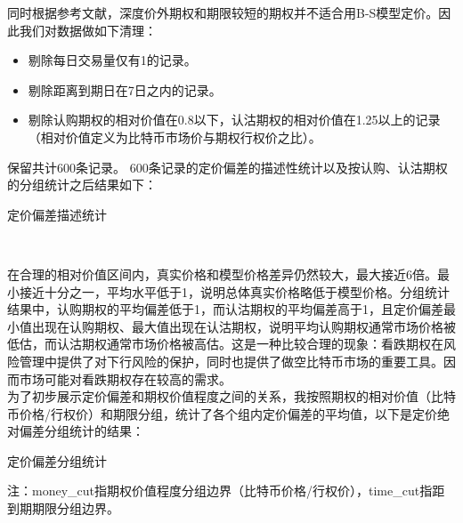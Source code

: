 同时根据参考文献，深度价外期权和期限较短的期权并不适合用B-S模型定价\cite{10.2307/1831029}\cite{Jame-1979}。因此我们对数据做如下清理：
\begin{itemize}
    \item 剔除每日交易量仅有1的记录。
    \item 剔除距离到期日在7日之内的记录。
    \item 剔除认购期权的相对价值在0.8以下，认沽期权的相对价值在1.25以上的记录（相对价值定义为比特币市场价与期权行权价之比）。
    
\end{itemize}
保留共计600条记录。
600条记录的定价偏差的描述性统计以及按认购、认沽期权的分组统计之后结果如下：
~\\
\begin{center}
    \begin{threeparttable}[H]
    
        \begin{small}
            \caption{定价偏差描述统计}
            \label{tab:option_bias_group}
                
                
        \end{small} 
    \end{threeparttable}
\end{center}
~\\
\par{在合理的相对价值区间内，真实价格和模型价格差异仍然较大，最大接近6倍。最小接近十分之一，平均水平低于1，说明总体真实价格略低于模型价格。分组统计结果中，认购期权的平均偏差低于1，而认沽期权的平均偏差高于1，且定价偏差最小值出现在认购期权、最大值出现在认沽期权，说明平均认购期权通常市场价格被低估，而认沽期权通常市场价格被高估。这是一种比较合理的现象：看跌期权在风险管理中提供了对下行风险的保护，同时也提供了做空比特币市场的重要工具。因而市场可能对看跌期权存在较高的需求。}
~\\
为了初步展示定价偏差和期权价值程度之间的关系，我按照期权的相对价值（比特币价格/行权价）和期限分组，统计了各个组内定价偏差的平均值，以下是定价绝对偏差分组统计的结果：
~\\
\begin{center}
    \begin{threeparttable}[H]
        \centering
        \begin{small}
            \caption{定价偏差分组统计}
            \label{tab:option_bias_group}
                
                \begin{tablenotes}
                    \footnotesize
                    \item 注：money\_cut指期权价值程度分组边界（比特币价格/行权价），time\_cut指距到期期限分组边界。
                    
                \end{tablenotes}
        \end{small}
    \end{threeparttable}
        
\end{center}
